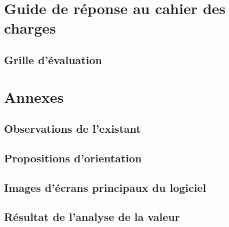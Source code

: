 \section{Guide de réponse au cahier des charges}
\subsection{Grille d'évaluation}

\section{Annexes}
\subsection{Observations de l'existant}
\subsection{Propositions d'orientation}
\subsection{Images d'écrans principaux du logiciel}
\subsection{Résultat de l'analyse de la valeur}